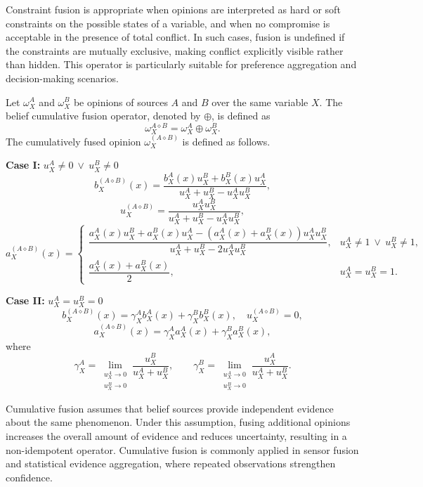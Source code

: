 Constraint fusion is appropriate when opinions are interpreted as hard or soft constraints on the possible states of a variable, and when no compromise is acceptable in the presence of total conflict. In such cases, fusion is undefined if the constraints are mutually exclusive, making conflict explicitly visible rather than hidden. This operator is particularly suitable for preference aggregation and decision-making scenarios.

\begin{definition}
\label{def:cumulative_fuse}
Let $\omega_X^A$ and $\omega_X^B$ be opinions of sources $A$ and $B$ over the same variable $X$. The belief cumulative fusion operator, denoted by $\oplus$, is defined as
\[
\omega_X^{A\diamond B} = \omega_X^A \oplus \omega_X^B .
\]
The cumulatively fused opinion $\omega_X^{(A\diamond B)}$ is defined as follows.

\textbf{Case I:} $u_X^A \neq 0 \ \vee\ u_X^B \neq 0$
\[
b_X^{(A\diamond B)}(x)=
\frac{b_X^A(x)u_X^B+b_X^B(x)u_X^A}{u_X^A+u_X^B-u_X^A u_X^B},
\]
\[
u_X^{(A\diamond B)}=
\frac{u_X^A u_X^B}{u_X^A+u_X^B-u_X^A u_X^B},
\]
\[
a_X^{(A\diamond B)}(x)=
\begin{cases}
\dfrac{a_X^A(x)u_X^B+a_X^B(x)u_X^A-(a_X^A(x)+a_X^B(x))u_X^A u_X^B}
{u_X^A+u_X^B-2u_X^A u_X^B},
& u_X^A\neq1 \ \vee\ u_X^B\neq1,\\[1em]
\dfrac{a_X^A(x)+a_X^B(x)}{2},
& u_X^A=u_X^B=1.
\end{cases}
\]

\textbf{Case II:} $u_X^A=u_X^B=0$
\[
b_X^{(A\diamond B)}(x)=\gamma_X^A b_X^A(x)+\gamma_X^B b_X^B(x),
\quad
u_X^{(A\diamond B)}=0,
\]
\[
a_X^{(A\diamond B)}(x)=\gamma_X^A a_X^A(x)+\gamma_X^B a_X^B(x),
\]
where
\[
\gamma_X^A=\lim_{\substack{u_X^A\to0\\u_X^B\to0}}\frac{u_X^B}{u_X^A+u_X^B},
\qquad
\gamma_X^B=\lim_{\substack{u_X^A\to0\\u_X^B\to0}}\frac{u_X^A}{u_X^A+u_X^B}.
\]

\end{definition}

Cumulative fusion assumes that belief sources provide independent evidence about the same phenomenon. 
Under this assumption, fusing additional opinions increases the overall amount of evidence and reduces uncertainty, resulting in a non-idempotent operator. 
Cumulative fusion is commonly applied in sensor fusion and statistical evidence aggregation, where repeated observations strengthen confidence.


